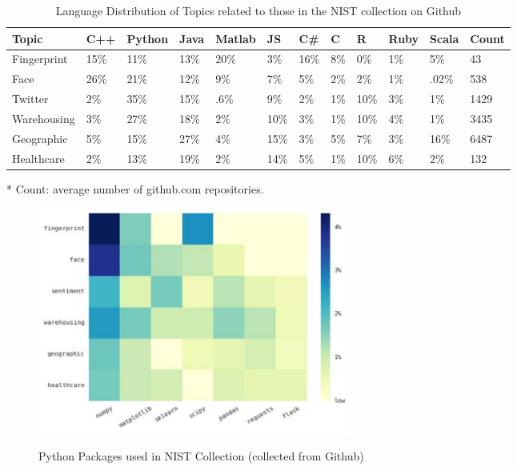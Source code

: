 \documentclass[9pt,twocolumn,twoside]{styles/osajnl}
\begin{document}
\begin{table}[htb]
  \begin{center}
    \begin{small}
      \begin{threeparttable}
	\begin{tabular}{l|l|l|l|l|l|l|l|l|l|l|l}

	  Topic & C++ &  Python &  Java &  Matlab &  JS &  C\# &  C &  R &  Ruby &  Scala &  Count\tnote{*} \tabularnewline \hline \hline
	  Fingerprint& 15\% & 11\% & 13\% & 20\% & 3\% & 16\% & 8\% & 0\% & 1\% & 5\% & 43 \tabularnewline \hline
	  Face & 26\% & 21\% & 12\% & 9\% & 7\% & 5\% & 2\% & 2\% & 1\% & .02\% & 538 \tabularnewline \hline
	  Twitter & 2\% & 35\% & 15\% & .6\% & 9\% & 2\% & 1\% & 10\% & 3\% & 1\% & 1429 \tabularnewline \hline
	  Warehousing & 3\% & 27\% & 18\% & 2\% & 10\% & 3\% & 1\% & 10\% & 4\% & 1\% & 3435  \tabularnewline \hline
	  Geographic & 5\% & 15\% & 27\% & 4\% & 15\% & 3\% & 5\% & 7\% & 3\% & 16\% & 6487 \tabularnewline \hline
	  Healthcare & 2\% & 13\% & 19\% & 2\% & 14\% & 5\% & 1\% & 10\% & 6\% & 2\% & 132 \tabularnewline

	\end{tabular}
	\caption{Language Distribution of Topics related to those in the NIST collection on Github}
	\label{tab:language-distribution}
	\begin{tablenotes}
	\item[*] Count: average number of github.com repositories.
	\end{tablenotes}
      \end{threeparttable}
    \end{small}
  \end{center}
\end{table}

\begin{figure}[htb]
  \begin{center}
    \begin{small}
  \caption{Python Packages used in NIST Collection (collected from Github)}
  \centering
  \includegraphics[width=0.5\textwidth]{images/packages-heatmap}
  \label{fig:packages-heatmap}
\end{small}
\end{center}
\end{figure}
\end{document}

